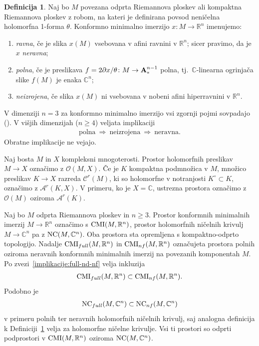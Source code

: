 \documentclass[12pt,a4paper,twoside]{article}
\theoremstyle{definition} %
\newtheorem{definicija}{Definicija}[section]
\theoremstyle{plain} %
\numberwithin{equation}{section}  %
\newcommand{\R}{\mathbb R}
\newcommand{\C}{\mathbb C}
\begin{document}
\begin{definicija} \label{def:full-flat-nd}
Naj bo $M$ povezana odprta Riemannova ploskev ali kompaktna Riemannova ploskev z robom, na kateri je definirana povsod neničelna holomorfna 1-forma $\theta$. Konformno minimalno imerzijo $x \colon M \to \R^{n}$ imenujemo:
\begin{enumerate}
\item \emph{ravna}, če je slika $x(M)$ vsebovana v afini ravnini v $\R^{n}$; sicer pravimo, da je $x$ \emph{neravna};
\item \emph{polna}, če je preslikava $f = 2 \partial{x} / \theta \colon M \to \textbf{\textup{A}}_{*}^{n-1}$ polna, tj.~$\C$-linearna ogrinjača slike $f(M)$ je enaka $\C^{n}$;
\item \emph{neizrojena}, če slika $x(M)$ ni vsebovana v nobeni afini hiperravnini v $\R^{n}$. 
\end{enumerate}
\end{definicija}

V dimenziji  $n=3$ za konformno minimalno imerzijo vsi zgornji pojmi sovpadajo (\cite[Lemma~12.4]{osserman2002survey}). V višjih dimenzijah ($n \geq 4$) veljata implikaciji
\begin{gather} \label{implikacije:full-nd-nf}
\text{polna} \ \Rightarrow \ \text{neizrojena} \ \Rightarrow \ \text{neravna}.
\end{gather}
Obratne implikacije ne vejajo.

Naj bosta $M$ in $X$ kompleksni mnogoterosti. Prostor holomorfnih preslikav $M \to X$ označimo z $\mathcal{O}(M,X)$.
Če je $K$ kompaktna podmnožica v $M$, množico preslikav $K \to X$ razreda $\mathcal{C}^{r}(M)$, ki so holomorfne v notranjosti $K^\circ \subset K$, označimo z $\mathcal{A}^{r}(K,X)$.
V primeru, ko je $X = \C$, ustrezna prostora označimo z $\mathcal{O}(M)$ oziroma $\mathcal{A}^{r}(K)$.

Naj bo $M$ odprta Riemannova ploskev in $n \geq 3$. Prostor konformnih minimalnih imerzij $M \to \R^{n}$ označimo s $\textup{CMI}(M, \R^{n})$, prostor holomorfnih ničelnih krivulj $M \to \C^{n}$ pa z $\textup{NC}(M, \C^{n})$. Oba prostora sta opremljena s kompaktno-odprto topologijo.
Nadalje $\textup{CMI}_{full}(M, \R^{n})$ in $\textup{CMI}_{nf}(M, \R^{n})$ označujeta prostora polnih oziroma neravnih konformnih minimalnih imerzij na povezanih komponentah $M$. Po zvezi~\eqref{implikacije:full-nd-nf} velja inkluzija 
\begin{gather*}
\textup{CMI}_{full}(M, \R^{n}) \subset \textup{CMI}_{nf}(M, \R^{n}).
\end{gather*}
%
Podobno je 
\begin{gather*}
\textup{NC}_{full}(M, \C^{n}) \subset \textup{NC}_{nf}(M, \C^{n})
\end{gather*} 
v primeru polnih ter neravnih holomorfnih ničelnih krivulj, saj analogna definicija k Definiciji~\ref{def:full-flat-nd} velja za holomorfne ničelne krivulje. Vsi ti prostori so odprti podprostori v $\textup{CMI}(M, \R^{n})$ oziroma $\textup{NC}(M, \C^{n})$.
\end{document}
